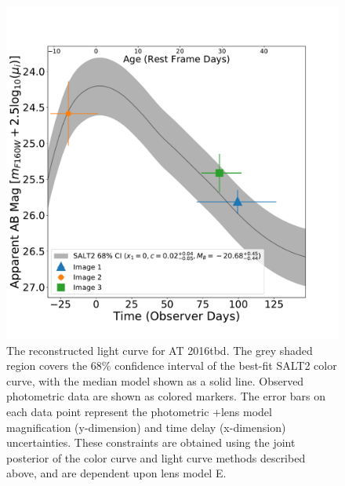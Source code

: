 \documentclass[12pt]{article}
\def\SNABC{AT 2016tbd\xspace}
\begin{document}
\begin{figure}[htp]
    \centering
    \includegraphics[width=\textwidth]{Paper/Figures/full_lightcurve.pdf}
    \caption{\label{fig:full_lightcurve}The reconstructed light curve for \SNABC. The grey shaded region covers the 68\% confidence interval of the best-fit SALT2 color curve, with the median model shown as a solid line. Observed photometric data are shown as colored markers.   The error bars on each data point represent the photometric +lens model magnification (y-dimension) and time delay (x-dimension) uncertainties. These constraints are obtained using the joint posterior of the color curve and light curve methods described above, and are dependent upon lens model E.}
\end{figure}
\end{document}
